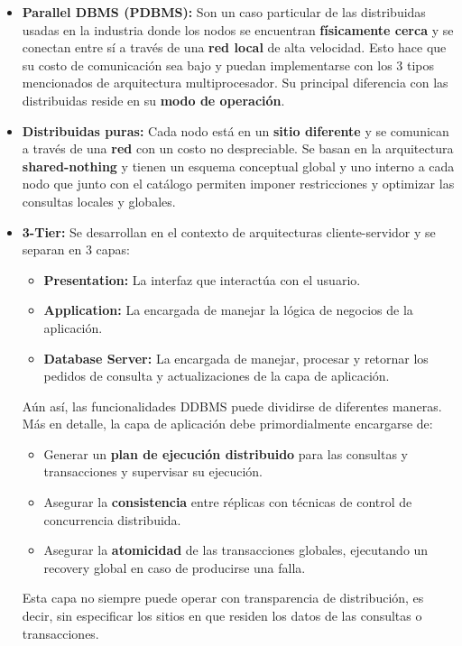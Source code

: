 \begin{itemize}
    \item \textbf{Parallel DBMS (PDBMS):} Son un caso particular de las distribuidas usadas en la industria donde los nodos se encuentran \textbf{físicamente cerca} y se conectan entre sí a través de una \textbf{red local} de alta velocidad. Esto hace que su costo de comunicación sea bajo y puedan implementarse con los 3 tipos mencionados de arquitectura multiprocesador. Su principal diferencia con las distribuidas reside en su \textbf{modo de operación}.
    \item \textbf{Distribuidas puras:} Cada nodo está en un \textbf{sitio diferente} y se comunican a través de una \textbf{red} con un costo no despreciable. Se basan en la arquitectura \textbf{shared-nothing} y tienen un esquema conceptual global y uno interno a cada nodo que junto con el catálogo permiten imponer restricciones y optimizar las consultas locales y globales.
    \item \textbf{3-Tier:} Se desarrollan en el contexto de arquitecturas cliente-servidor y se separan en 3 capas:
    \begin{itemize}
        \item \textbf{Presentation:} La interfaz que interactúa con el usuario.
        \item \textbf{Application:} La encargada de manejar la lógica de negocios de la aplicación.
        \item \textbf{Database Server:} La encargada de manejar, procesar y retornar los pedidos de consulta y actualizaciones de la capa de aplicación.
    \end{itemize}
    Aún así, las funcionalidades DDBMS puede dividirse de diferentes maneras. Más en detalle, la capa de aplicación debe primordialmente encargarse de:
    \begin{itemize}
        \item Generar un \textbf{plan de ejecución distribuido} para las consultas y transacciones y supervisar su ejecución.
        \item Asegurar la \textbf{consistencia} entre réplicas con técnicas de control de concurrencia distribuida.
        \item Asegurar la \textbf{atomicidad} de las transacciones globales, ejecutando un recovery global en caso de producirse una falla.
    \end{itemize}
    Esta capa no siempre puede operar con transparencia de distribución, es decir, sin especificar los sitios en que residen los datos de las consultas o transacciones.
\end{itemize}


